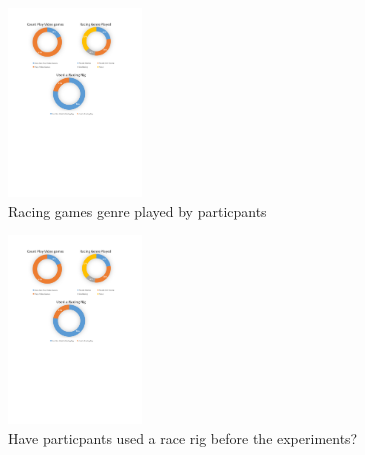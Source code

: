 \begin{figure}[!htb]
	\centering
	\includegraphics[height=5cm]{charts/gamesGenrePlayed.pdf}
	\caption[Racing games genre played by particpants]{Racing games genre played by particpants}
	\label{fig:chart-gamesGenrePlayed}
\end{figure}

\begin{figure}[!htb]
	\centering
	\includegraphics[height=5cm]{charts/usedARacingRig.pdf}
	\caption[Have particpants used a race rig?]{Have particpants used a race rig before the experiments?}
	\label{fig:chart-usedARacingRig}
\end{figure}

